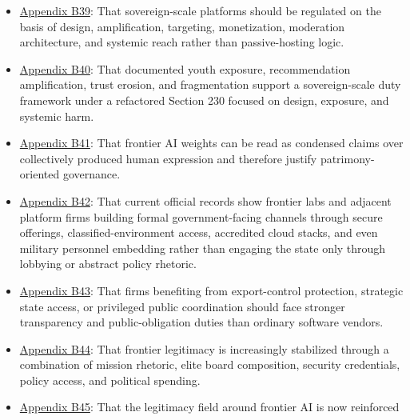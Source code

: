 \documentclass[
  american,
  11pt,
  letterpaper,
]{article}
\providecommand{\tightlist}{%
  \setlength{\itemsep}{0pt}\setlength{\parskip}{0pt}}
\begin{document}
\begin{itemize}
\tightlist
\item
  \hyperref[appendix-b39-sovereign-scale-platforms-should-be-regulated-on-the-basis-of-design-amplificati]{Appendix
  B39}: That sovereign-scale platforms should be regulated on the basis
  of design, amplification, targeting, monetization, moderation
  architecture, and systemic reach rather than passive-hosting logic.
\item
  \hyperref[appendix-b40-documented-youth-exposure-recommendation-amplification-trust-erosion-and-fragm]{Appendix
  B40}: That documented youth exposure, recommendation amplification,
  trust erosion, and fragmentation support a sovereign-scale duty
  framework under a refactored Section 230 focused on design, exposure,
  and systemic harm.
\item
  \hyperref[appendix-b41-frontier-ai-weights-can-be-read-as-condensed-claims-over-collectively-produced-hu]{Appendix
  B41}: That frontier AI weights can be read as condensed claims over
  collectively produced human expression and therefore justify
  patrimony-oriented governance.
\item
  \hyperref[appendix-b42-current-official-records-show-frontier-labs-and-adjacent-platform-firms-building]{Appendix
  B42}: That current official records show frontier labs and adjacent
  platform firms building formal government-facing channels through
  secure offerings, classified-environment access, accredited cloud
  stacks, and even military personnel embedding rather than engaging the
  state only through lobbying or abstract policy rhetoric.
\item
  \hyperref[appendix-b43-firms-benefiting-from-export-control-protection-strategic-state-access-or-privi]{Appendix
  B43}: That firms benefiting from export-control protection, strategic
  state access, or privileged public coordination should face stronger
  transparency and public-obligation duties than ordinary software
  vendors.
\item
  \hyperref[appendix-b44-frontier-legitimacy-is-increasingly-stabilized-through-a-combination-of-mission-r]{Appendix
  B44}: That frontier legitimacy is increasingly stabilized through a
  combination of mission rhetoric, elite board composition, security
  credentials, policy access, and political spending.
\item
  \hyperref[appendix-b45-the-legitimacy-field-around-frontier-ai-is-now-reinforced-not-only-by-boards-pol]{Appendix
  B45}: That the legitimacy field around frontier AI is now reinforced

\end{itemize}
\end{document}
